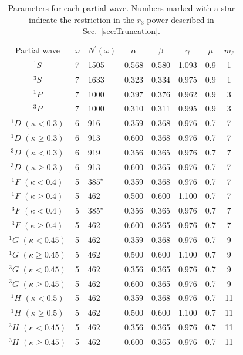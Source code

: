 \documentclass[preprint,showpacs,showkeys,preprintnumbers,amsmath,amssymb,longbibliography,pra,aps]{revtex4-1}
\begin{document}
{\begin{table}[H]
  \centering
  \begin{ruledtabular}
    \begin{tabular}{cclccccc}
	Partial wave & $\omega$ & $N^\prime(\omega)$ & $\alpha$ & $\beta$ & $\gamma$ & $\mu$ & $m_\ell$ \\
	\colrule
	$^1S$                      & 7 & 1505        & 0.568 & 0.580 & 1.093 & 0.9 & 1 \\
	$^3S$                      & 7 & 1633        & 0.323 & 0.334 & 0.975 & 0.9 & 1 \\
	$^1P$                      & 7 & 1000        & 0.397 & 0.376 & 0.962 & 0.9 & 3 \\
	$^3P$                      & 7 & 1000        & 0.310 & 0.311 & 0.995 & 0.9 & 3 \\
	$^1D$ $(\kappa < 0.3)$     & 6 & 916         & 0.359 & 0.368 & 0.976 & 0.7 & 7 \\
	$^1D$ $(\kappa \geq 0.3)$  & 6 & 913         & 0.600 & 0.368 & 0.976 & 0.7 & 7 \\
	$^3D$ $(\kappa < 0.3)$     & 6 & 919         & 0.356 & 0.365 & 0.976 & 0.7 & 7 \\
	$^3D$ $(\kappa \geq 0.3)$  & 6 & 913         & 0.600 & 0.365 & 0.976 & 0.7 & 7 \\
	$^1F$ $(\kappa < 0.4)$     & 5 & $385^\star$ & 0.359 & 0.368 & 0.976 & 0.7 & 7 \\
	$^1F$ $(\kappa \geq 0.4)$  & 5 & 462         & 0.500 & 0.600 & 1.100 & 0.7 & 7 \\
	$^3F$ $(\kappa < 0.4)$     & 5 & $385^\star$ & 0.356 & 0.365 & 0.976 & 0.7 & 7 \\
    $^3F$ $(\kappa \geq 0.4)$  & 5 & 462         & 0.600 & 0.365 & 0.976 & 0.7 & 7 \\
	$^1G$ $(\kappa < 0.45)$    & 5 & 462         & 0.359 & 0.368 & 0.976 & 0.7 & 9 \\
    $^1G$ $(\kappa \geq 0.45)$ & 5 & 462         & 0.500 & 0.600 & 1.100 & 0.7 & 9 \\
	$^3G$ $(\kappa < 0.45)$    & 5 & 462         & 0.356 & 0.365 & 0.976 & 0.7 & 9 \\
    $^3G$ $(\kappa \geq 0.45)$ & 5 & 462         & 0.600 & 0.365 & 0.976 & 0.7 & 9 \\
	$^1H$ $(\kappa < 0.5)$     & 5 & 462         & 0.359 & 0.368 & 0.976 & 0.7 & 11 \\
	$^1H$ $(\kappa \geq 0.5)$  & 5 & 462         & 0.500 & 0.600 & 1.100 & 0.7 & 11 \\
	$^3H$ $(\kappa < 0.45)$    & 5 & 462         & 0.356 & 0.365 & 0.976 & 0.7 & 11 \\
    $^3H$ $(\kappa \geq 0.45)$ & 5 & 462         & 0.600 & 0.365 & 0.976 & 0.7 & 11 \\
	\end{tabular}
  \end{ruledtabular}
  \caption{Parameters for each partial wave. Numbers marked with a star indicate the
restriction in the $r_3$ power described in Sec.~\ref{sec:Truncation}.}
  \label{tab:Nonlinear}
\end{table}	


}
\end{document}
